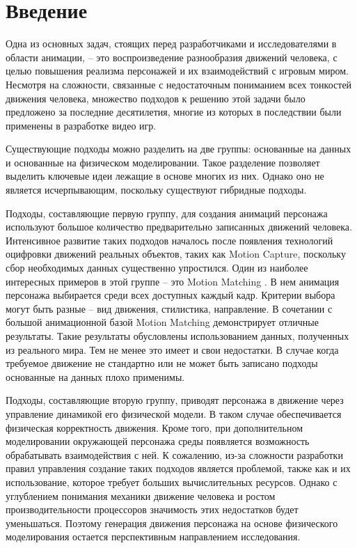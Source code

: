 \section{Введение}

Одна из основных задач, стоящих перед разработчиками и исследователями в области анимации, -- это воспроизведение разнообразия движений человека, с целью повышения реализма персонажей и их взаимодействий с игровым миром. Несмотря на сложности, связанные с недостаточным пониманием всех тонкостей движения человека, множество подходов к решению этой задачи было предложено за последние десятилетия, многие из которых в последствии были применены в разработке видео игр.

Существующие подходы можно разделить на две группы: основанные на данных и основанные на физическом моделировании. Такое разделение позволяет выделить ключевые идеи лежащие в основе многих из них. Однако оно не является исчерпывающим, поскольку существуют гибридные подходы.

Подходы, составляющие первую группу, для создания анимаций персонажа используют большое количество предварительно записанных движений человека. Интенсивное развитие таких подходов началось после появления технологий оцифровки движений реальных объектов, таких как Motion Capture, поскольку сбор необходимых данных существенно упростился. Один из наиболее интересных примеров в этой группе -- это Motion Matching \cite{MotionMatching}. В нем анимация персонажа выбирается среди всех доступных каждый кадр. Критерии выбора могут быть разные -- вид движения, стилистика, направление. В сочетании с большой анимационной базой Motion Matching демонстрирует отличные результаты. Такие результаты обусловлены использованием данных, полученных из реального мира. Тем не менее это имеет и свои недостатки. В случае когда требуемое движение не стандартно или не может быть записано подходы основанные на данных плохо применимы.

Подходы, составляющие вторую группу, приводят персонажа в движение через управление динамикой его физической модели. В таком случае обеспечивается физическая корректность движения. Кроме того, при дополнительном моделировании окружающей персонажа среды появляется возможность обрабатывать взаимодействия с ней. К сожалению, из-за сложности разработки правил управления создание таких подходов является проблемой, также как и их использование, которое требует больших вычислительных ресурсов. Однако с углублением понимания механики движение человека и ростом производительности процессоров значимость этих недостатков будет уменьшаться. Поэтому генерация движения персонажа на основе физического моделирования остается перспективным направлением исследования.

